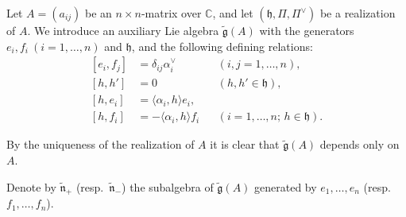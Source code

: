 \documentclass[12pt]{article}
\begin{document}
\begin{definition}
     Let $A = (a_{ij})$ be an $n \times n$-matrix over $\mathbb{C}$, and let
    $(\mathfrak{h}, \Pi, \Pi^\vee)$ be a realization of $A$. We introduce
    an auxiliary Lie algebra $\tilde{\mathfrak{g}}(A)$ with the generators
    $e_i, f_i \ (i=1,\dots,n)$ and $\mathfrak{h}$, and the following defining relations:
    \[
        \begin{aligned}
            [e_i, f_j] & = \delta_{ij}\alpha_i^\vee         &  & (i,j=1,\dots,n),                     \\
            [h,h']     & = 0                                &  & (h,h' \in \mathfrak{h}),             \\
            [h, e_i]   & = \langle \alpha_i, h \rangle e_i,                                           \\
            [h, f_i]   & = -\langle \alpha_i, h \rangle f_i &  & (i=1,\dots,n;\, h \in \mathfrak{h}).
        \end{aligned}
    \]

    By the uniqueness of the realization of $A$ it is clear that
    $\tilde{\mathfrak{g}}(A)$ depends only on $A$.
\end{definition}

Denote by $\tilde{\mathfrak{n}}_+$ (resp.\ $\tilde{\mathfrak{n}}_-$) the subalgebra of $\tilde{\mathfrak{g}}(A)$ generated by $e_1,\dots,e_n$ (resp.\ $f_1,\dots,f_n$).
\end{document}

